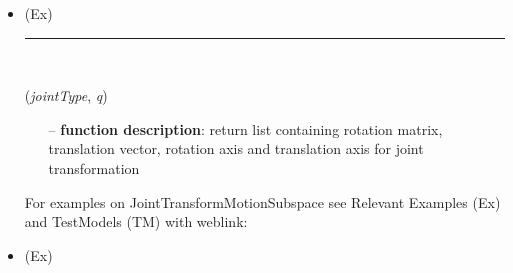 \begin{itemize}[leftmargin=1.4cm]
\begin{itemize}[leftmargin=1.4cm]
\begin{itemize}[leftmargin=0.5cm]
\begin{itemize}[leftmargin=1.4cm]
\begin{itemize}[leftmargin=1.4cm]
\begin{itemize}[leftmargin=0.5cm]
\begin{itemize}[leftmargin=1.4cm]
\begin{itemize}[leftmargin=0.5cm]
\begin{itemize}[leftmargin=1.4cm]
\begin{itemize}[leftmargin=1.4cm]
\begin{itemize}[leftmargin=1.4cm]
\bi
 \item \footnotesize {} (Ex)
\ei

%
\noindent\rule{8cm}{0.75pt}\vspace{1pt} \\ 
\begin{flushleft}
\label{sec:kinematicTree:JointTransformMotionSubspace}
({\it jointType}, {\it q})
\end{flushleft}
\setlength{\itemindent}{0.7cm}
\begin{itemize}[leftmargin=0.7cm]
\item[--]{\bf function description}: return list containing rotation matrix, translation vector, rotation axis and translation axis for joint transformation
\vspace{12pt}\end{itemize}
%
%
\noindent For examples on JointTransformMotionSubspace see Relevant Examples (Ex) and TestModels (TM) with weblink:
\bi
 \item \footnotesize {} (Ex)
\ei


\end{itemize}
\end{itemize}
\end{itemize}
\end{itemize}
\end{itemize}
\end{itemize}
\end{itemize}
\end{itemize}
\end{itemize}
\end{itemize}
\end{itemize}

